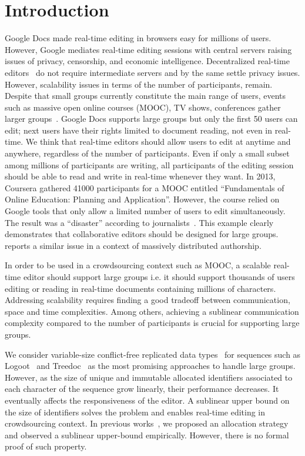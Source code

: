 

\section{Introduction}

Google Docs made real-time editing in browsers easy for millions of
users. However, Google mediates real-time editing sessions with
central servers raising issues of privacy, censorship, and economic
intelligence. Decentralized real-time editors~\cite{oster2006data,
  sun1998operational, sun2009contextbased} do not require intermediate
servers and by the same settle privacy issues. However, scalability
issues in terms of the number of participants, remain.  Despite that
small groups currently constitute the main range of users, events such
as massive open online courses (MOOC), TV shows, conferences gather
larger groups~\cite{breslow2013studying}.  Google Docs supports large
groups but only the first 50 users can edit; next users have their
rights limited to document reading, not even in real-time.  We think
that real-time editors should allow users to edit at anytime and
anywhere, regardless of the number of participants. Even if only a
small subset among millions of participants are writing, all
participants of the editing session should be able to read and write
in real-time whenever they want. In 2013, Coursera gathered 41000
participants for a MOOC entitled ``Fundamentals of Online Education:
Planning and Application''. However, the course relied on Google tools
that only allow a limited number of users to edit simultaneously.  The result
was a ``disaster'' according to journalists~\cite{slate13,wp13}. This example
clearly demonstrates that collaborative editors should be designed for large
groups. \cite{chi12} reports a similar issue in a context of massively
distributed authorship.

In order to be used in a crowdsourcing context such as MOOC, a
scalable real-time editor should support large groups i.e. it should
support thousands of users editing or reading in real-time documents
containing millions of characters. Addressing scalability requires
finding a good tradeoff between communication, space and time
complexities. Among others, achieving a sublinear communication
complexity compared to the number of participants is crucial for
supporting large groups.

We consider variable-size conflict-free replicated data
types~\cite{shapiro2011comprehensive} for sequences such as
Logoot~\cite{weiss2010logootundo} and Treedoc~\cite{preguica2009commutative} as
the most promising approaches to handle large groups. However, as the size of
unique and immutable allocated identifiers associated to each character of the
sequence grow linearly, their performance decreases. It eventually affects the
responsiveness of the editor. A sublinear upper bound on the size of identifiers
solves the problem and enables real-time editing in crowdsourcing context.  In
previous works~\cite{nedelec2013concurrency, nedelec2013lseq}, we proposed an
allocation strategy and observed a sublinear upper-bound empirically. However,
there is no formal proof of such property.

